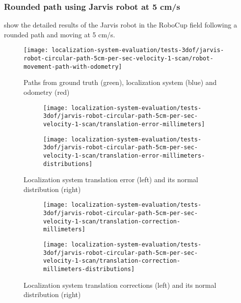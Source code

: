 \subsubsection{Rounded path using Jarvis robot at 5 cm/s}

 show the detailed results of the Jarvis robot in the RoboCup field following a rounded path and moving at 5 cm/s.

\begin{figure}[H]
	\centering
	\texttt{[image: localization-system-evaluation/tests-3dof/jarvis-robot-circular-path-5cm-per-sec-velocity-1-scan/robot-movement-path-with-odometry]}
	\caption{Paths from ground truth (green), localization system (blue) and odometry (red)}
	\label{fig:localization-system-evaluation_jarvis-robot-circular-path-5cm-per-sec-velocity-1-scan}
\end{figure}

\begin{figure}[H]
	\centering
	\begin{subfigure}[h]{.497\textwidth}
		\centering
		\texttt{[image: localization-system-evaluation/tests-3dof/jarvis-robot-circular-path-5cm-per-sec-velocity-1-scan/translation-error-millimeters]}
	\end{subfigure}
	\begin{subfigure}[h]{.497\textwidth}
		\centering
		\texttt{[image: localization-system-evaluation/tests-3dof/jarvis-robot-circular-path-5cm-per-sec-velocity-1-scan/translation-error-millimeters-distributions]}
	\end{subfigure}
	\caption{Localization system translation error (left) and its normal distribution (right)}
	\label{fig:localization-system-evaluation_jarvis-robot-circular-path-5cm-per-sec-velocity-1-scan_translation-errors}
\end{figure}

\begin{figure}[H]
	\centering
	\begin{subfigure}[h]{.497\textwidth}
		\centering
		\texttt{[image: localization-system-evaluation/tests-3dof/jarvis-robot-circular-path-5cm-per-sec-velocity-1-scan/translation-correction-millimeters]}
	\end{subfigure}
	\begin{subfigure}[h]{.497\textwidth}
		\centering
		\texttt{[image: localization-system-evaluation/tests-3dof/jarvis-robot-circular-path-5cm-per-sec-velocity-1-scan/translation-correction-millimeters-distributions]}
	\end{subfigure}
	\caption{Localization system translation corrections (left) and its normal distribution (right)}
	\label{fig:localization-system-evaluation_jarvis-robot-circular-path-5cm-per-sec-velocity-1-scan_translation-errors-corrections}
\end{figure}

